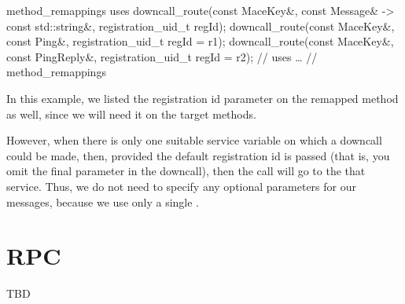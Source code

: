 \begin{programlisting}
method_remappings {
  uses {
    downcall_route(const MaceKey&, const Message& -> const std::string&, registration_uid_t regId);
    downcall_route(const MaceKey&, const Ping&, registration_uid_t regId = r1);
    downcall_route(const MaceKey&, const PingReply&, registration_uid_t regId = r2);
  } // uses
  \ldots
} // method_remappings
\end{programlisting}

In this example, we listed the registration id parameter on the remapped
method as well, since we will need it on the target methods.

However, when there is only one suitable service variable on which a
downcall could be made, then, provided the default registration id is
passed (that is, you omit the final parameter in the downcall), then
the call will go to the that service.  Thus, we do not need to specify
any optional parameters for our messages, because we use only a single
.


\section{RPC}
\label{sec:RPC}
TBD %

